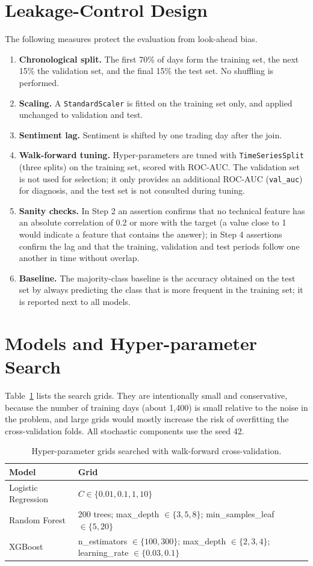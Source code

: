 \section{Leakage-Control Design}
The following measures protect the evaluation from look-ahead bias.
\begin{enumerate}
  \item \textbf{Chronological split.} The first 70\% of days form the training set, the next 15\% the validation set, and the final 15\% the test set. No shuffling is performed.
  \item \textbf{Scaling.} A \texttt{StandardScaler} is fitted on the training set only, and applied unchanged to validation and test.
  \item \textbf{Sentiment lag.} Sentiment is shifted by one trading day after the join.
  \item \textbf{Walk-forward tuning.} Hyper-parameters are tuned with \texttt{TimeSeriesSplit} (three splits) on the training set, scored with ROC-AUC. The validation set is not used for selection; it only provides an additional ROC-AUC (\texttt{val\_auc}) for diagnosis, and the test set is not consulted during tuning.
  \item \textbf{Sanity checks.} In Step 2 an assertion confirms that no technical feature has an absolute correlation of 0.2 or more with the target (a value close to 1 would indicate a feature that contains the answer); in Step 4 assertions confirm the lag and that the training, validation and test periods follow one another in time without overlap.
  \item \textbf{Baseline.} The majority-class baseline is the accuracy obtained on the test set by always predicting the class that is more frequent in the training set; it is reported next to all models.
\end{enumerate}

\section{Models and Hyper-parameter Search}
Table~\ref{tab:grids} lists the search grids. They are intentionally small and conservative, because the number of training days (about 1,400) is small relative to the noise in the problem, and large grids would mostly increase the risk of overfitting the cross-validation folds. All stochastic components use the seed 42.

\begin{table}[!htbp]
\centering
\small
\begin{tabularx}{\textwidth}{@{}l X@{}}
\toprule
Model & Grid \\
\midrule
Logistic Regression & $C \in \{0.01, 0.1, 1, 10\}$ \\
Random Forest & 200 trees; max\_depth $\in \{3, 5, 8\}$; min\_samples\_leaf $\in \{5, 20\}$ \\
XGBoost & n\_estimators $\in \{100, 300\}$; max\_depth $\in \{2, 3, 4\}$; learning\_rate $\in \{0.03, 0.1\}$ \\
\bottomrule
\end{tabularx}
\caption{Hyper-parameter grids searched with walk-forward cross-validation.}
\label{tab:grids}
\end{table}


